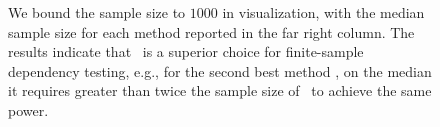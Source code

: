 \documentclass[simplex.tex]{subfiles}
\begin{document}
\begin{figure}[h!]
\begin{cframed}
{%
We bound the sample size to $1000$ in visualization, with the median sample size for each method reported in the far right column. The results indicate that \Mgc~is a superior choice for finite-sample dependency testing, e.g., for the second best method \Hhg, on the median it requires greater than twice the sample size of \Mgc~to achieve the same power.}
		\label{fig:mgcall}
		\end{cframed}
\end{figure}

\clearpage
\end{document}
